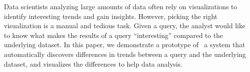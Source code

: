Data scientists analyzing large amounts of data often rely on visualizations to
identify interesting trends and gain insights. However, picking the right
visualization is a manual and tedious task. Given a query, the analyst would
like to know what makes the results of a query ``interesting'' compared to the
underlying dataset. In this paper, we demonstrate a prototype of \SeeDB\, a
system that automatically discovers differences in trends between a query and
the underlying dataset, and visualizes the differences to help data analysis.